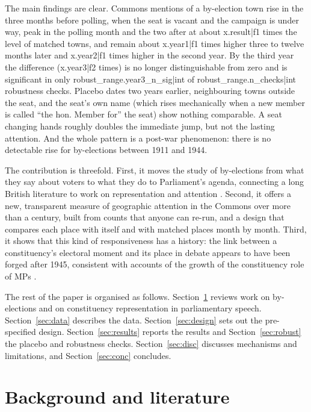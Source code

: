 \documentclass[11pt,a4paper]{article}
\begin{document}
The main findings are clear. Commons mentions of a by-election town rise in the three months before polling, when the seat is vacant and the campaign is under way, peak in the polling month and the two after at about {{x.result|f1}} times the level of matched towns, and remain about {{x.year1|f1}} times higher three to twelve months later and {{x.year2|f1}} times higher in the second year. By the third year the difference ({{x.year3|f2}} times) is no longer distinguishable from zero and is significant in only {{robust_range.year3_n_sig|int}} of {{robust_range.n_checks|int}} robustness checks. Placebo dates two years earlier, neighbouring towns outside the seat, and the seat's own name (which rises mechanically when a new member is called ``the hon. Member for'' the seat) show nothing comparable. A seat changing hands roughly doubles the immediate jump, but not the lasting attention. And the whole pattern is a post-war phenomenon: there is no detectable rise for by-elections between 1911 and 1944.

The contribution is threefold. First, it moves the study of by-elections from what they say about voters to what they do to Parliament's agenda, connecting a long British literature to work on representation and attention \citep{eulau1977,jones2005}. Second, it offers a new, transparent measure of geographic attention in the Commons over more than a century, built from counts that anyone can re-run, and a design that compares each place with itself and with matched places month by month. Third, it shows that this kind of responsiveness has a history: the link between a constituency's electoral moment and its place in debate appears to have been forged after 1945, consistent with accounts of the growth of the constituency role of MPs \citep{norton1994,norton1993}.

The rest of the paper is organised as follows. Section~\ref{sec:lit} reviews work on by-elections and on constituency representation in parliamentary speech. Section~\ref{sec:data} describes the data. Section~\ref{sec:design} sets out the pre-specified design. Section~\ref{sec:results} reports the results and Section~\ref{sec:robust} the placebo and robustness checks. Section~\ref{sec:disc} discusses mechanisms and limitations, and Section~\ref{sec:conc} concludes.

\section{Background and literature}\label{sec:lit}
\end{document}
